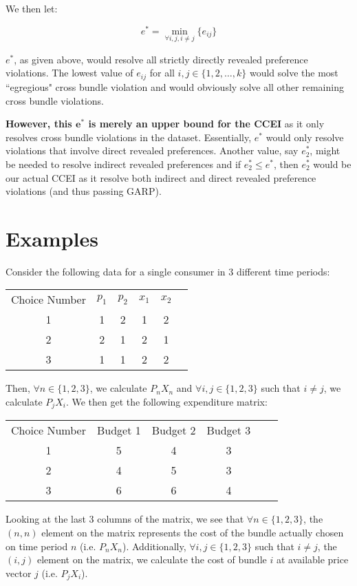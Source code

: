 \documentclass{article} %
\begin{document}
We then let:

$$e^{*}=\min_{\forall i,j, i\not=j}\{e_{ij}\}$$

$e^{*}$, as given above, would resolve all strictly directly revealed preference violations. The lowest value of $e_{ij}$ for all $i,j\in\{1,2,\ldots,k\}$ would solve the most ``egregious" cross bundle violation and would obviously solve all other remaining cross bundle violations.


\textbf{However, this $\mathbf{e^*}$ is merely an upper bound for the CCEI} as it only resolves cross bundle violations in the dataset. Essentially, $e^*$ would only resolve violations that involve direct revealed preferences. Another value, say $e^*_{2}$, might be needed to resolve indirect revealed preferences and if $e^*_{2}\leq e^*$, then $e^*_{2}$ would be our actual CCEI as it resolve both indirect and direct revealed preference violations (and thus passing GARP).

\section{Examples}

Consider the following data for a single consumer in 3 different time periods:

\begin{center}
\begin{tabular}{ cccccc } 
Choice Number & $p_{1}$ & $p_{2}$ & $x_{1}$ & $x_{2}$ \\
1&1&2&1&2 \\
2&2&1&2&1 \\
3&1&1&2&2
\end{tabular}
\end{center}

Then, $\forall n\in\{1,2,3\}$, we calculate $P_{n}X_{n}$ and $\forall i,j\in\{1,2,3\}$ such that $i\not=j$, we calculate $P_{j}X_{i}$. We then get the following expenditure matrix:

\begin{center}
\begin{tabular}{ cccccc } 
Choice Number & Budget 1 & Budget 2 & Budget 3 \\
1&5&4&3 \\
2&4&5&3 \\
3&6&6&4
\end{tabular}
\end{center}

Looking at the last 3 columns of the matrix, we see that $\forall n\in\{1,2,3\}$, the $(n,n)$ element on the matrix represents the cost of the bundle actually chosen on time period $n$ (i.e. $P_{n}X_{n}$). Additionally, $\forall i,j\in\{1,2,3\}$ such that $i\not=j$, the $(i,j)$ element on the matrix, we calculate the cost of bundle $i$ at available price vector $j$ (i.e. $P_{j}X_{i}$).
\bigskip
\end{document}
